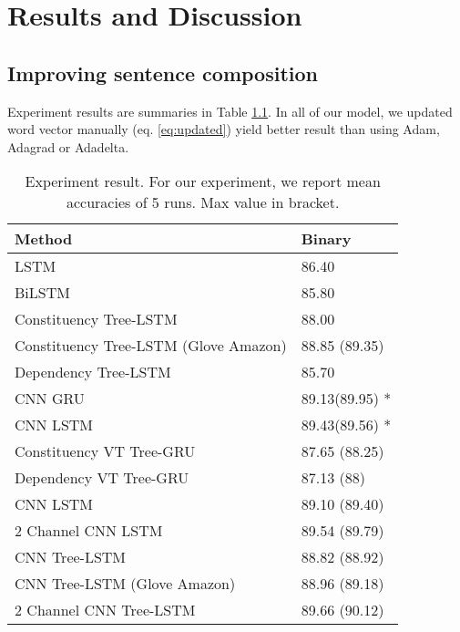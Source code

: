 \hypertarget{chap:result}{\chapter{Results and Discussion}}\label{result-discuss}


\section{Improving sentence composition}
Experiment results are summaries in Table \ref{table:experimentresult}. In all of our model, we updated word vector manually (eq. \ref{eq:updated}) yield better result than using Adam, Adagrad or Adadelta. 

\begin{table}[H]
	\centering
	\caption{Experiment result. For our experiment, we report mean accuracies of 5 runs. Max value in bracket.}
	\label{table:experimentresult}
	\begin{tabular}{ll}
		Method                                   & Binary \\ \hline
		LSTM                                     & 86.40   \\
		BiLSTM                                   & 85.80   \\ \hline
		Constituency Tree-LSTM \cite{treeLSTM} & 88.00     \\
		Constituency Tree-LSTM \cite{treeLSTM} (Glove Amazon) & 88.85 (89.35) \\
		Dependency Tree-LSTM  \cite{treeLSTM}  & 85.70   \\ 
		CNN GRU \cite{cnn-rnn}					& 89.13(89.95) *	\\
		CNN LSTM \cite{cnn-rnn}					& 89.43(89.56) *	\\ \hline
		Constituency VT Tree-GRU                 & 87.65 (88.25)  \\
		Dependency VT Tree-GRU                   & 87.13  (88)  \\ \hline
		CNN LSTM 								& 89.10 (89.40)      \\
		2 Channel CNN LSTM						& 89.54	(89.79)	\\
		CNN Tree-LSTM                            & 88.82 (88.92) \\
		CNN Tree-LSTM (Glove Amazon) 			& 88.96 (89.18) \\
		2 Channel CNN Tree-LSTM  				& 89.66 (90.12)
	\end{tabular}
\end{table}

